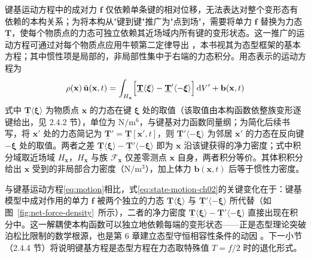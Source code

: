 键基运动方程中的成对力 $\mathbf{f}$ 仅依赖单条键的相对位移，无法表达对整个变形态有依赖的本构关系；为将本构从"键到键"推广为"点到场"，需要将单力 $\mathbf{f}$ 替换为力态 $\underline{\mathbf{T}}$，使每个物质点的力态可独立依赖其近场域内所有键的变形状态。这一推广的运动方程可通过对每个物质点应用牛顿第二定律导出 \cite{Silling2007}，本书视其为态型框架的基本方程；其中惯性项是局部的，非局部性集中于右端的力态积分。用态表示的运动方程为
\begin{equation}
  \rho(\mathbf{x})\,\ddot{\mathbf{u}}(\mathbf{x},t)=\int_{H_{\mathbf{x}}}\Bigl[\underline{\mathbf{T}}\langle\boldsymbol{\xi}\rangle-\underline{\mathbf{T}}'\langle-\boldsymbol{\xi}\rangle\Bigr]\,\mathrm{d}V'+\mathbf{b}(\mathbf{x},t)
  \label{eq:state-motion-ch02}
\end{equation}
式中 $\underline{\mathbf{T}}\langle\boldsymbol{\xi}\rangle$ 为物质点 $\mathbf{x}$ 的力态在键 $\boldsymbol{\xi}$ 处的取值（该取值由本构函数依整族变形逐键给出，见 2.4.2 节），单位为 $\mathrm{N}/\mathrm{m}^{6}$，与键基对力函数同量纲；为简化后续书写，将 $\mathbf{x}'$ 处的力态简记为 $\underline{\mathbf{T}}'=\underline{\mathbf{T}}[\mathbf{x}',t]$，则 $\underline{\mathbf{T}}'\langle-\boldsymbol{\xi}\rangle$ 为邻居 $\mathbf{x}'$ 的力态在反向键 $-\boldsymbol{\xi}$ 处的取值。两者之差 $\underline{\mathbf{T}}\langle\boldsymbol{\xi}\rangle-\underline{\mathbf{T}}'\langle-\boldsymbol{\xi}\rangle$ 即为 $\mathbf{x}$ 沿该键获得的净力密度；式中积分域取近场域 $H_{\mathbf{x}}$，$H_{\mathbf{x}}$ 与族 $\mathcal{F}_{\mathbf{x}}$ 仅差零测点 $\mathbf{x}$ 自身，两者积分等价。其体积积分给出 $\mathbf{x}$ 受到的非局部合力密度（$\mathrm{N}/\mathrm{m}^{3}$），加上体力 $\mathbf{b}(\mathbf{x},t)$ 后等于惯性力密度。

与键基运动方程\eqref{eq:motion}相比，式\eqref{eq:state-motion-ch02}的关键变化在于：键基模型中成对作用的单力 $\mathbf{f}$ 被两个独立的力态 $\underline{\mathbf{T}}\langle\boldsymbol{\xi}\rangle$ 与 $\underline{\mathbf{T}}'\langle-\boldsymbol{\xi}\rangle$ 所代替（如图~\ref{fig:net-force-density}~所示），二者的净力密度 $\underline{\mathbf{T}}\langle\boldsymbol{\xi}\rangle-\underline{\mathbf{T}}'\langle-\boldsymbol{\xi}\rangle$ 直接出现在积分中。这一解耦使本构函数可以独立地依赖每端的变形状态——正是态型理论突破泊松比限制的数学根源，也是第 6 章建立态型守恒相容性条件的动因 \cite{Silling2007,SillingLehoucq2010}。下一小节（2.4.4 节）将说明键基方程是态型方程在力态取特殊值 $T=f/2$ 时的退化形式。

